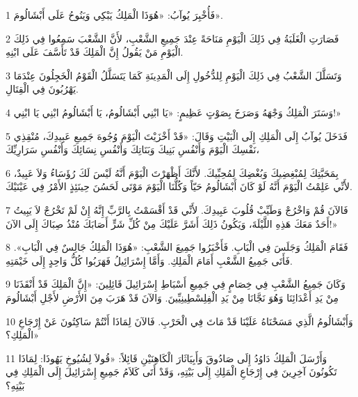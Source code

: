 \par 1 فَأُخْبِرَ يُوآبُ: «هُوَذَا الْمَلِكُ يَبْكِي وَيَنُوحُ عَلَى أَبْشَالُومَ».
\par 2 فَصَارَتِ الْغَلَبَةُ فِي ذَلِكَ الْيَوْمِ مَنَاحَةً عِنْدَ جَمِيعِ الشَّعْبِ، لأَنَّ الشَّعْبَ سَمِعُوا فِي ذَلِكَ الْيَوْمِ مَنْ يَقُولُ إِنَّ الْمَلِكَ قَدْ تَأَسَّفَ عَلَى ابْنِهِ.
\par 3 وَتَسَلَّلَ الشَّعْبُ فِي ذَلِكَ الْيَوْمِ لِلدُّخُولِ إِلَى الْمَدِينَةِ كَمَا يَتَسَلَّلُ الْقَوْمُ الْخَجِلُونَ عِنْدَمَا يَهْرُبُونَ فِي الْقِتَالِ.
\par 4 وَسَتَرَ الْمَلِكُ وَجْهَهُ وَصَرَخَ بِصَوْتٍ عَظِيمٍ: «يَا ابْنِي أَبْشَالُومُ، يَا أَبْشَالُومُ ابْنِي يَا ابْنِي!»
\par 5 فَدَخَلَ يُوآبُ إِلَى الْمَلِكِ إِلَى الْبَيْتِ وَقَالَ: «قَدْ أَخْزَيْتَ الْيَوْمَ وُجُوهَ جَمِيعِ عَبِيدِكَ، مُنْقِذِي نَفْسِكَ الْيَوْمَ وَأَنْفُسِ بَنِيكَ وَبَنَاتِكَ وَأَنْفُسِ نِسَائِكَ وَأَنْفُسِ سَرَارِيِّكَ،
\par 6 بِمَحَبَّتِكَ لِمُبْغِضِيكَ وَبُغْضِكَ لِمُحِبِّيكَ. لأَنَّكَ أَظْهَرْتَ الْيَوْمَ أَنَّهُ لَيْسَ لَكَ رُؤَسَاءُ وَلاَ عَبِيدٌ، لأَنِّي عَلِمْتُ الْيَوْمَ أَنَّهُ لَوْ كَانَ أَبْشَالُومُ حَيّاً وَكُلُّنَا الْيَوْمَ مَوْتَى لَحَسُنَ حِينَئِذٍ الأَمْرُ فِي عَيْنَيْكَ.
\par 7 فَالآنَ قُمْ وَاخْرُجْ وَطَيِّبْ قُلُوبَ عَبِيدِكَ. لأَنِّي قَدْ أَقْسَمْتُ بِالرَّبِّ إِنَّهُ إِنْ لَمْ تَخْرُجْ لاَ يَبِيتُ أَحَدٌ مَعَكَ هَذِهِ اللَّيْلَةَ، وَيَكُونُ ذَلِكَ أَشَرَّ عَلَيْكَ مِنْ كُلِّ شَرٍّ أَصَابَكَ مُنْذُ صِبَاكَ إِلَى الآنَ!»
\par 8 فَقَامَ الْمَلِكُ وَجَلَسَ فِي الْبَابِ. فَأَخْبَرُوا جَمِيعَ الشَّعْبِ: «هُوَذَا الْمَلِكُ جَالِسٌ فِي الْبَابِ». فَأَتَى جَمِيعُ الشَّعْبِ أَمَامَ الْمَلِكِ. وَأَمَّا إِسْرَائِيلُ فَهَرَبُوا كُلُّ وَاحِدٍ إِلَى خَيْمَتِهِ.
\par 9 وَكَانَ جَمِيعُ الشَّعْبِ فِي خِصَامٍ فِي جَمِيعِ أَسْبَاطِ إِسْرَائِيلَ قَائِلِينَ: «إِنَّ الْمَلِكَ قَدْ أَنْقَذَنَا مِنْ يَدِ أَعْدَائِنَا وَهُوَ نَجَّانَا مِنْ يَدِ الْفِلِسْطِينِيِّينَ. وَالآنَ قَدْ هَرَبَ مِنَ الأَرْضِ لأَجْلِ أَبْشَالُومَ
\par 10 وَأَبْشَالُومُ الَّذِي مَسَحْنَاهُ عَلَيْنَا قَدْ مَاتَ فِي الْحَرْبِ. فَالآنَ لِمَاذَا أَنْتُمْ سَاكِتُونَ عَنْ إِرْجَاعِ الْمَلِكِ؟»
\par 11 وَأَرْسَلَ الْمَلِكُ دَاوُدُ إِلَى صَادُوقَ وَأَبِيَاثَارَ الْكَاهِنَيْنِ قَائِلاً: «قُولاَ لِشُيُوخِ يَهُوذَا: لِمَاذَا تَكُونُونَ آخِرِينَ فِي إِرْجَاعِ الْمَلِكِ إِلَى بَيْتِهِ، وَقَدْ أَتَى كَلاَمُ جَمِيعِ إِسْرَائِيلَ إِلَى الْمَلِكِ فِي بَيْتِهِ؟
